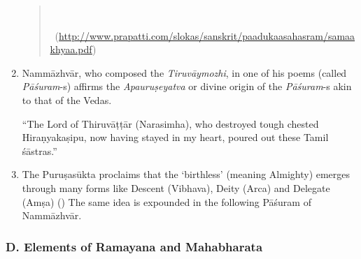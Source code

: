 \begin{enumerate}[{\rm 1.}]
\begin{verse}
\\

~\hfill (\url{http://www.prapatti.com/slokas/sanskrit/paadukaasahasram/samaakhyaa.pdf})
\end{verse}


 \item 
 Nammāzhvār, who composed the \textit{Tiruvāymozhi}, in one of his poems (called \textit{Pāśuram}-s) affirms the \textit{Apauruṣeyatva} or divine origin of the \textit{Pāśuram}-s akin to that of the Vedas.

\begin{myquote}
\end{myquote}

 “The Lord of Thiruvāṭṭār (Narasimha), who destroyed tough chested Hiraṇyakaṣipu, now having stayed in my heart, poured out these Tamil śāstras.”

 \item 
 The Puruṣasūkta proclaims that the ‘birthless’ (meaning Almighty) emerges through many forms like Descent (Vibhava), Deity (Arca) and Delegate (Amṣa) (\textbf{}) The same idea is expounded in the following Pāśuram of Nammāzhvār.


\end{enumerate}


\subsubsection*{D. Elements of Ramayana and Mahabharata}

